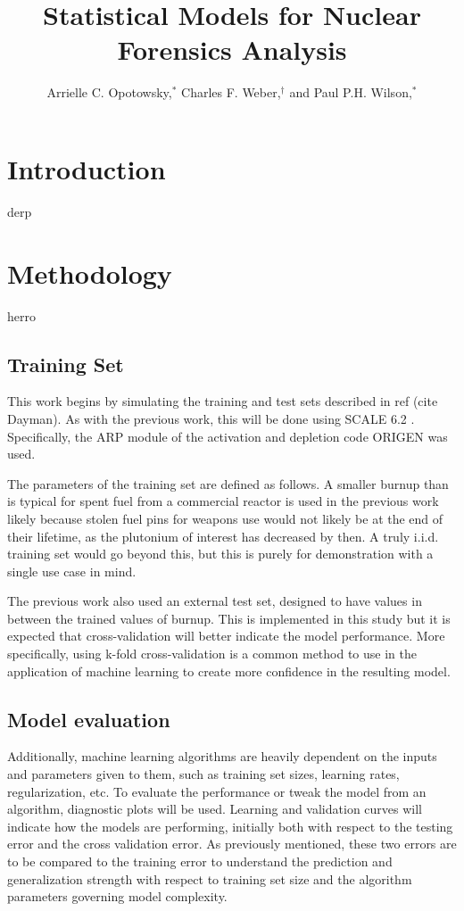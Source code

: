 \documentclass{anstrans}
\title{Statistical Models for Nuclear Forensics Analysis}
\author{Arrielle C. Opotowsky,$^{*}$ Charles F. Weber,$^{\dagger}$ and Paul P.H. Wilson,$^{*}$}
\institute{
$^{*}$Computational Nuclear Engineering Research Group, University of Wisconsin--Madison, Madison, WI, opotowsky@wisc.edu, paul.wilson@wisc.edu
\and
$^{\dagger}$Nuclear Security Modeling Group, Oak Ridge National Laboratory, Oak Ridge, TN, webercf@ornl.gov
}
\begin{document}
\section{Introduction}
derp



\section{Methodology}
herro 

\subsection{Training Set}
This work begins by simulating the training and test sets described in ref
(cite Dayman). As with the previous work, this will be done using SCALE 6.2
. Specifically, the ARP module of the activation and depletion code
ORIGEN was used. 

The parameters of the training set are defined as follows. A smaller burnup
than is typical for spent fuel from a commercial reactor is used in the
previous work likely because stolen fuel pins for weapons use would not likely
be at the end of their lifetime, as the plutonium of interest has decreased by
then. A truly i.i.d. training set would go beyond this, but this is purely for
demonstration with a single use case in mind. 

The previous work also used an external test set, designed to have values in
between the trained values of burnup. This is implemented in this study but it
is expected that cross-validation will better indicate the model performance.
More specifically, using k-fold cross-validation is a common method to use in
the application of machine learning to create more confidence in the resulting
model. 

\subsection{Model evaluation}
Additionally, machine learning algorithms are heavily dependent on the inputs
and parameters given to them, such as training set sizes, learning rates,
regularization, etc. To evaluate the performance or tweak the model from an
algorithm, diagnostic plots will be used. Learning and validation curves will
indicate how the models are performing, initially both with respect to the
testing error and the cross validation error. As previously mentioned, these
two errors are to be compared to the training error to understand the
prediction and generalization strength with respect to training set size and
the algorithm parameters governing model complexity. 
\end{document}

